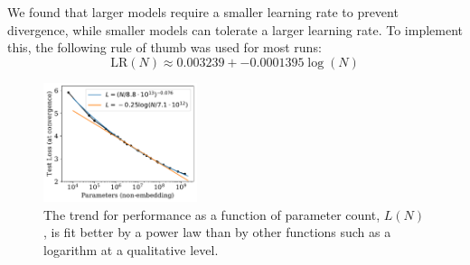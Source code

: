 \documentclass[english]{article}
\begin{document}
We found that larger models require a smaller learning rate to prevent divergence, while smaller models can tolerate a larger learning rate.  To implement this, the following rule of thumb was used for most runs:
\begin{equation}
\mathrm{LR}(N) \approx 0.003239 + -0.0001395  \log(N)
\end{equation}

\begin{figure}
\noindent \centering{} 
\includegraphics[width=0.40\textwidth]{PoorLogFit}
\caption[Comparison of Power-Law and Logarithmic Fits]{The trend for performance as a function of parameter count, $L(N)$, is fit better by a power law than by other functions such as a logarithm at a qualitative level.  \label{fig:PoorLogFit}}
\end{figure}

\listoffigures
\listoftables



\end{document}
